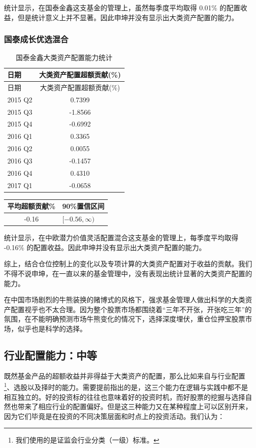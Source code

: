\documentclass[hyperref,]{ctexart}
\begin{document}
统计显示，在国泰金鑫这支基金的管理上，虽然每季度平均取得 0.01\%
的配置收益，但是统计意义上并不显著。因此申坤并没有显示出大类资产配置的能力。

\subsubsection{国泰成长优选混合}\label{-2}

\begin{longtable}[]{@{}lc@{}}
\caption{国泰金鑫大类资产配置能力统计}\tabularnewline
\toprule
日期 & 大类资产配置超额贡献(\%)\tabularnewline
\midrule
\endfirsthead
\toprule
日期 & 大类资产配置超额贡献(\%)\tabularnewline
\midrule
\endhead
2015 Q2 & 0.7399\tabularnewline
2015 Q3 & -1.8566\tabularnewline
2015 Q4 & -0.6992\tabularnewline
2016 Q1 & 0.3365\tabularnewline
2016 Q2 & 0.0055\tabularnewline
2016 Q3 & -0.1457\tabularnewline
2016 Q4 & 0.4310\tabularnewline
2017 Q1 & -0.0658\tabularnewline
\bottomrule
\end{longtable}

\begin{longtable}[]{@{}cl@{}}
\toprule
平均超额贡献\% & 90\%置信区间\tabularnewline
\midrule
\endhead
-0.16 & \([-0.56,\infty)\)\tabularnewline
\bottomrule
\end{longtable}

统计显示，在中欧潜力价值灵活配置混合这支基金的管理上，每季度平均取得
-0.16\% 的配置收益。因此申坤并没有显示出大类资产配置的能力。

综上，结合仓位控制上的变化以及专项计算的大类资产配置对于收益的贡献。我们不得不说申坤，在一直以来的基金管理中，没有表现出统计显著的大类资产配置的能力。

在中国市场剧烈的牛熊装换的赌博式的风格下，强求基金管理人做出科学的大类资产配置视乎也不太合理。因为整个股票市场都围绕着``三年不开张，开张吃三年''的氛围，在不能明确预测市场牛熊变化的情况下，选择深度埋伏，重仓位押宝股票市场，似乎也是科学的选择。

\subsection{行业配置能力：中等}

既然基金产品的超额收益并非得益于大类资产的配置，那么比如来自与行业配置\footnote{我们使用的是证监会行业分类（一级）标准。}、选股以及择时的能力。需要提前指出的是，这三个能力在逻辑与实践中都不是相互独立的。好的投资标的往往也意味着好的投资时机，而好股票的挖掘与选择自然也带来了相应行业的配置偏好。但是这三种能力又在某种程度上可以区别开来，因为它们毕竟是在投资的不同决策层面和时点上的投资活动。我们认为：
\end{document}
